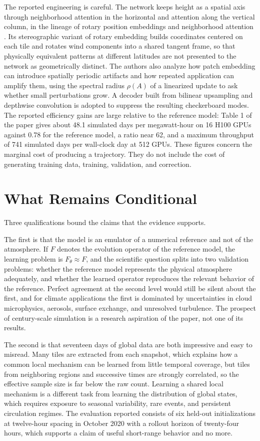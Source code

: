 \documentclass[11pt]{article}
\theoremstyle{definition}
\theoremstyle{remark}
\begin{document}
The reported engineering is careful. The network keeps height as a spatial axis through neighborhood attention in the horizontal and attention along the vertical column, in the lineage of rotary position embeddings \cite{su2021roformer} and neighborhood attention \cite{hassani2023nat}. Its stereographic variant of rotary embedding builds coordinates centered on each tile and rotates wind components into a shared tangent frame, so that physically equivalent patterns at different latitudes are not presented to the network as geometrically distinct. The authors also analyze how patch embedding can introduce spatially periodic artifacts and how repeated application can amplify them, using the spectral radius $\rho(A)$ of a linearized update to ask whether small perturbations grow. A decoder built from bilinear upsampling and depthwise convolution is adopted to suppress the resulting checkerboard modes. The reported efficiency gains are large relative to the reference model: Table 1 of the paper gives about 48.1 simulated days per megawatt-hour on 16 H100 GPUs against 0.78 for the reference model, a ratio near 62, and a maximum throughput of 741 simulated days per wall-clock day at 512 GPUs. These figures concern the marginal cost of producing a trajectory. They do not include the cost of generating training data, training, validation, and correction.

\section{What Remains Conditional}

Three qualifications bound the claims that the evidence supports.

The first is that the model is an emulator of a numerical reference and not of the atmosphere. If $F$ denotes the evolution operator of the reference model, the learning problem is $F_\theta \approx F$, and the scientific question splits into two validation problems: whether the reference model represents the physical atmosphere adequately, and whether the learned operator reproduces the relevant behavior of the reference. Perfect agreement at the second level would still be silent about the first, and for climate applications the first is dominated by uncertainties in cloud microphysics, aerosols, surface exchange, and unresolved turbulence. The prospect of century-scale simulation is a research aspiration of the paper, not one of its results.

The second is that seventeen days of global data are both impressive and easy to misread. Many tiles are extracted from each snapshot, which explains how a common local mechanism can be learned from little temporal coverage, but tiles from neighboring regions and successive times are strongly correlated, so the effective sample size is far below the raw count. Learning a shared local mechanism is a different task from learning the distribution of global states, which requires exposure to seasonal variability, rare events, and persistent circulation regimes. The evaluation reported consists of six held-out initializations at twelve-hour spacing in October 2020 with a rollout horizon of twenty-four hours, which supports a claim of useful short-range behavior and no more.
\end{document}
